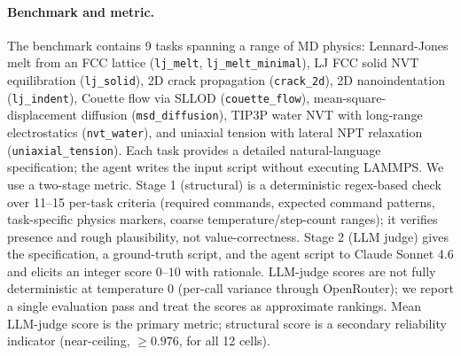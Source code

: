 \documentclass{article}
\begin{document}
\paragraph{Benchmark and metric.}
The benchmark contains 9 tasks spanning a range of MD physics: Lennard-Jones melt from an FCC lattice (\texttt{lj\_melt}, \texttt{lj\_melt\_minimal}), LJ FCC solid NVT equilibration (\texttt{lj\_solid}), 2D crack propagation (\texttt{crack\_2d}), 2D nanoindentation (\texttt{lj\_indent}), Couette flow via SLLOD (\texttt{couette\_flow}), mean-square-displacement diffusion (\texttt{msd\_diffusion}), TIP3P water NVT with long-range electrostatics (\texttt{nvt\_water}), and uniaxial tension with lateral NPT relaxation (\texttt{uniaxial\_tension}). Each task provides a detailed natural-language specification; the agent writes the input script without executing LAMMPS. We use a two-stage metric. Stage 1 (structural) is a deterministic regex-based check over 11--15 per-task criteria (required commands, expected command patterns, task-specific physics markers, coarse temperature/step-count ranges); it verifies presence and rough plausibility, not value-correctness. Stage 2 (LLM judge) gives the specification, a ground-truth script, and the agent script to Claude Sonnet 4.6 and elicits an integer score $0$--$10$ with rationale. LLM-judge scores are not fully deterministic at temperature 0 (per-call variance through OpenRouter); we report a single evaluation pass and treat the scores as approximate rankings. Mean LLM-judge score is the primary metric; structural score is a secondary reliability indicator (near-ceiling, $\geq 0.976$, for all 12 cells).
\end{document}
